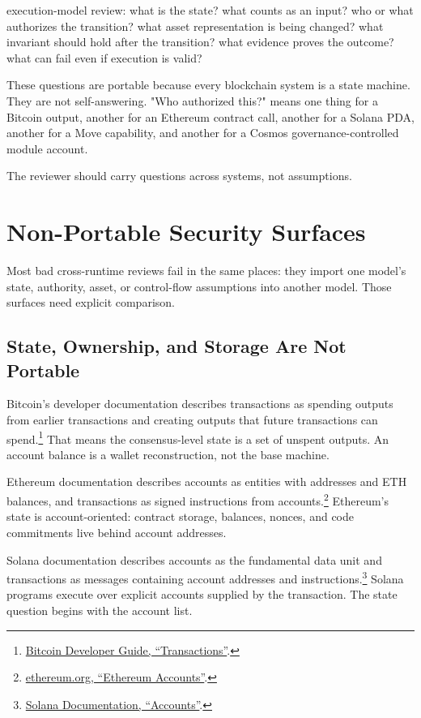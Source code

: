 \begin{codeblock}
execution-model review:
    what is the state?
    what counts as an input?
    who or what authorizes the transition?
    what asset representation is being changed?
    what invariant should hold after the transition?
    what evidence proves the outcome?
    what can fail even if execution is valid?
\end{codeblock}

These questions are portable because every blockchain system is a state machine. They are not self-answering. "Who authorized this?" means one thing for a Bitcoin output, another for an Ethereum contract call, another for a Solana PDA, another for a Move capability, and another for a Cosmos governance-controlled module account.

The reviewer should carry questions across systems, not assumptions.

\section{Non-Portable Security Surfaces}

Most bad cross-runtime reviews fail in the same places: they import one model's state, authority, asset, or control-flow assumptions into another model. Those surfaces need explicit comparison.

\subsection{State, Ownership, and Storage Are Not Portable}

Bitcoin's developer documentation describes transactions as spending outputs from earlier transactions and creating outputs that future transactions can spend.\footnote{\href{https://developer.bitcoin.org/devguide/transactions.html}{Bitcoin Developer Guide, ``Transactions''}.} That means the consensus-level state is a set of unspent outputs. An account balance is a wallet reconstruction, not the base machine.

Ethereum documentation describes accounts as entities with addresses and ETH balances, and transactions as signed instructions from accounts.\footnote{\href{https://ethereum.org/developers/docs/accounts/}{ethereum.org, ``Ethereum Accounts''}.} Ethereum's state is account-oriented: contract storage, balances, nonces, and code commitments live behind account addresses.

Solana documentation describes accounts as the fundamental data unit and transactions as messages containing account addresses and instructions.\footnote{\href{https://solana.com/docs/core/accounts}{Solana Documentation, ``Accounts''}.} Solana programs execute over explicit accounts supplied by the transaction. The state question begins with the account list.

